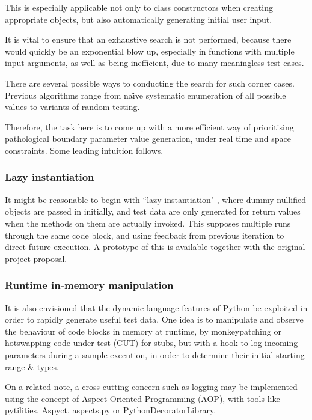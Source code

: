 \documentclass{icldt}
\numberwithin{equation}{section}       %
\def\naive{na\"{\i}ve }
\begin{document}
This is especially applicable not only to class constructors when creating appropriate objects, but also automatically generating initial user input.

It is vital to ensure that an exhaustive search is not performed, because there would quickly be an exponential blow up, especially in functions with multiple input arguments, as well as being inefficient, due to many meaningless test cases.

There are several possible ways to conducting the search for such corner cases. Previous algorithms range from \naive systematic enumeration of all possible values to variants of random testing.

Therefore, the task here is to come up with a more efficient way of prioritising pathological boundary parameter value generation, under real time and space constraints. Some leading intuition follows.
\subsubsection{Lazy instantiation}
	It might be reasonable to begin with ``lazy instantiation" \cite{Allwood2011}, where dummy nullified objects are passed in initially, and test data are only generated for return values when the methods on them are actually invoked. This supposes multiple runs through the same code block, and using feedback from previous iteration to direct future execution. A \href{https://github.com/evandrix/Pyrulan}{prototype} of this is available together with the original project proposal.

\subsubsection{Runtime in-memory manipulation}
It is also envisioned that the dynamic language features of Python be exploited in order to rapidly generate useful test data. One idea is to manipulate and observe the behaviour of code blocks in memory at runtime, by monkeypatching or hotswapping code under test (CUT) for stubs, but with a hook to log incoming parameters during a sample execution, in order to determine their initial starting range \& types.

On a related note, a cross-cutting concern such as logging may be implemented using the concept of Aspect Oriented Programming (AOP), with tools like pytilities, Aspyct, aspects.py or PythonDecoratorLibrary.
\end{document}
